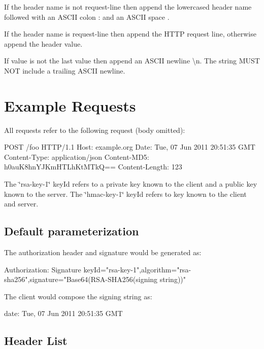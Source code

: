 \begin{DoxyEnumerate}
\item If the header name is not {\ttfamily request-\/line} then append the lowercased header name followed with an A\+S\+C\+I\+I colon {\ttfamily \+:} and an A\+S\+C\+I\+I space .
\item If the header name is {\ttfamily request-\/line} then append the H\+T\+T\+P request line, otherwise append the header value.
\item If value is not the last value then append an A\+S\+C\+I\+I newline {\ttfamily \textbackslash{}n}. The string M\+U\+S\+T N\+O\+T include a trailing A\+S\+C\+I\+I newline.
\end{DoxyEnumerate}

\section*{Example Requests}

All requests refer to the following request (body omitted)\+: \begin{DoxyVerb}POST /foo HTTP/1.1
Host: example.org
Date: Tue, 07 Jun 2011 20:51:35 GMT
Content-Type: application/json
Content-MD5: h0auK8hnYJKmHTLhKtMTkQ==
Content-Length: 123
\end{DoxyVerb}


The \char`\"{}rsa-\/key-\/1\char`\"{} key\+Id refers to a private key known to the client and a public key known to the server. The \char`\"{}hmac-\/key-\/1\char`\"{} key\+Id refers to key known to the client and server.

\subsection*{Default parameterization}

The authorization header and signature would be generated as\+: \begin{DoxyVerb}Authorization: Signature keyId="rsa-key-1",algorithm="rsa-sha256",signature="Base64(RSA-SHA256(signing string))"
\end{DoxyVerb}


The client would compose the signing string as\+: \begin{DoxyVerb}date: Tue, 07 Jun 2011 20:51:35 GMT
\end{DoxyVerb}


\subsection*{Header List}

